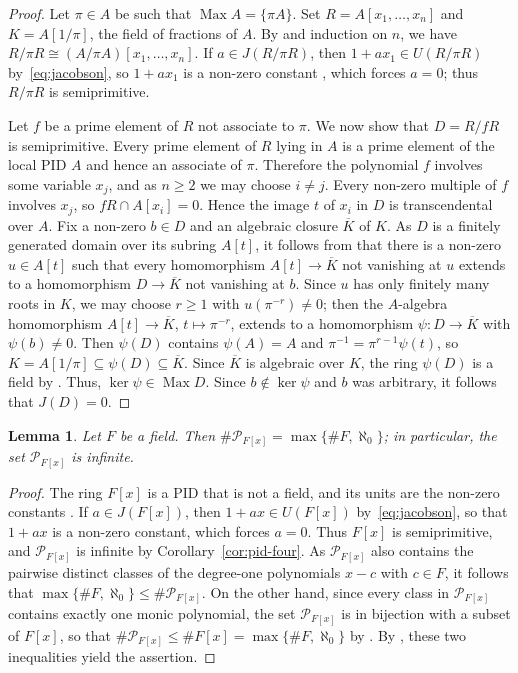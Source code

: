 \documentclass[12pt,reqno,a4paper]{amsart}
\newcommand{\Pe}{\mathcal{P}}
\DeclareMathOperator{\Max}{Max}
\theoremstyle{plain}
\newtheorem{lemma}[theorem]{Lemma}
\theoremstyle{definition}
\begin{document}
\begin{proof}
Let $\pi\in A$ be such that $\Max A=\{\pi A\}$. Set $R=A[x_1,\dots,x_n]$ and $K=A[1/\pi]$, the field of fractions of $A$. By \cite[Section~9.1, Proposition~2]{DummitFoote} and induction on $n$, we have $R/\pi R\cong(A/\pi A)[x_1,\dots,x_n]$. If $a\in J(R/\pi R)$, then $1+ax_1\in U(R/\pi R)$ by~\eqref{eq:jacobson}, so $1+ax_1$ is a non-zero constant \cite[Section~9.1, Proposition~1]{DummitFoote}, which forces $a=0$; thus $R/\pi R$ is semiprimitive.

Let $f$ be a prime element of $R$ not associate to $\pi$. We now show that $D=R/fR$ is semiprimitive. Every prime element of $R$ lying in $A$ is a prime element of the local PID $A$ and hence an associate of $\pi$. Therefore the polynomial $f$ involves some variable $x_j$, and as $n\geq2$ we may choose $i\neq j$. Every non-zero multiple of $f$ involves $x_j$, so $fR\cap A[x_i]=0$. Hence the image $t$ of $x_i$ in $D$ is transcendental over $A$. Fix a non-zero $b\in D$ and an algebraic closure $\overline{K}$ of $K$. As $D$ is a finitely generated domain over its subring $A[t]$, it follows from \cite[Proposition~5.23]{AtiyahMacdonald} that there is a non-zero $u\in A[t]$ such that every homomorphism $A[t]\to\overline{K}$ not vanishing at $u$ extends to a homomorphism $D\to\overline{K}$ not vanishing at $b$. Since $u$ has only finitely many roots in $K$, we may choose $r\geq1$ with $u(\pi^{-r})\neq0$; then the $A$-algebra homomorphism $A[t]\to\overline{K}$, $t\mapsto\pi^{-r}$, extends to a homomorphism $\psi\colon D\to\overline{K}$ with $\psi(b)\neq0$. Then $\psi(D)$ contains $\psi(A)=A$ and $\pi^{-1}=\pi^{r-1}\psi(t)$, so $K=A[1/\pi]\subseteq\psi(D)\subseteq\overline{K}$. Since $\overline{K}$ is algebraic over $K$, the ring $\psi(D)$ is a field by \cite[Proposition~5.7]{AtiyahMacdonald}. Thus, $\ker\psi\in\Max D$. Since $b\notin\ker\psi$ and $b$ was arbitrary, it follows that $J(D)=0$.
\end{proof}
\begin{lemma}\label{lem:field-primes}
Let $F$ be a field. Then $\#\Pe_{F[x]}=\max\{\#F,\aleph_0\}$; in particular, the set $\Pe_{F[x]}$ is infinite.
\end{lemma}
\begin{proof}
The ring $F[x]$ is a PID \cite[Section~9.2, Corollary~4]{DummitFoote} that is not a field, and its units are the non-zero constants \cite[Section~9.1, Proposition~1]{DummitFoote}. If $a\in J(F[x])$, then $1+ax\in U(F[x])$ by~\eqref{eq:jacobson}, so that $1+ax$ is a non-zero constant, which forces $a=0$. Thus $F[x]$ is semiprimitive, and $\Pe_{F[x]}$ is infinite by Corollary~\ref{cor:pid-four}. As $\Pe_{F[x]}$ also contains the pairwise distinct classes of the degree-one polynomials $x-c$ with $c\in F$, it follows that $\max\{\#F,\aleph_0\}\leq\#\Pe_{F[x]}$. On the other hand, since every class in $\Pe_{F[x]}$ contains exactly one monic polynomial, the set $\Pe_{F[x]}$ is in bijection with a subset of $F[x]$, so that $\#\Pe_{F[x]}\leq\#F[x]=\max\{\#F,\aleph_0\}$ by \cite[Theorem~3.5 and (3.14)]{Jech}. By \cite[Theorem~3.2]{Jech}, these two inequalities yield the assertion.
\end{proof}
\end{document}
